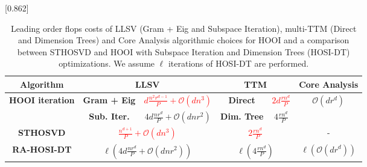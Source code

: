 \begin{table*}
    \scalebox{0.862}[0.862]{
        \begin{tabular}{c|c|c|c|c|c}
            \bf Algorithm & \multicolumn{2}{|c|}{\bf LLSV} & \multicolumn{2}{|c|}{\bf TTM} & \bf Core Analysis\\ \hline\hline
            \multirow{2}{*}{\bf HOOI iteration} & \bf Gram + Eig & \textcolor{red}{$d\frac{n^2r^{d-1}}{P} + \mathcal{O}(dn^3)$} & \bf Direct & \textcolor{red}{$2d\frac{rn^d}{P}$} & \multirow{2}{*}{$\mathcal{O}(dr^d)$}\\\cline{2-5}
            & \bf Sub. Iter. & $4d\frac{nr^d}{P} + \mathcal{O}(dnr^2)$ & \bf Dim. Tree & $4\frac{rn^d}{P}$\\\hline\hline
            \bf STHOSVD & \multicolumn{2}{|c|}{\textcolor{red}{$\frac{n^{d+1}}{P} + \mathcal{O}(dn^3)$}} & \multicolumn{2}{|c|}{\textcolor{red}{$2\frac{rn^d}{P}$}} & -\\\hline
            \bf RA-HOSI-DT & \multicolumn{2}{|c|}{$\ell\left(4d\frac{nr^d}{P} + \mathcal{O}(dnr^2)\right)$} & \multicolumn{2}{|c|}{$\ell\left(4\frac{rn^d}{P}\right)$} & $\ell \left(\mathcal{O}(dr^d)\right)$\\\hline
        \end{tabular}
    }
    \caption{Leading order flops costs of LLSV (Gram + Eig and Subspace Iteration), multi-TTM (Direct and Dimension Trees) and Core Analysis algorithmic choices for HOOI and a comparison between STHOSVD and HOOI with Subspace Iteration and Dimension Trees (HOSI-DT) optimizations. We assume $\ell$ iterations of HOSI-DT are performed.}
    \label{tab:flops}
\end{table*}

